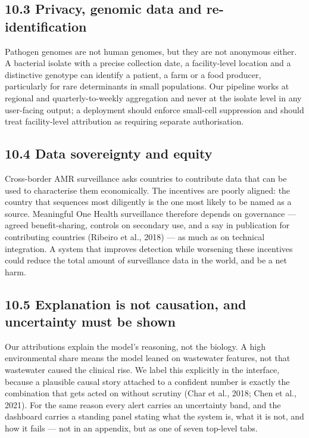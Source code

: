 \documentclass[11pt,a4paper]{article}
\begin{document}
\subsection*{10.3 Privacy, genomic data and re-identification}

Pathogen genomes are not human genomes, but they are not anonymous either. A bacterial isolate with a precise collection date, a facility-level location and a distinctive genotype can identify a patient, a farm or a food producer, particularly for rare determinants in small populations. Our pipeline works at regional and quarterly-to-weekly aggregation and never at the isolate level in any user-facing output; a deployment should enforce small-cell suppression and should treat facility-level attribution as requiring separate authorisation.

\subsection*{10.4 Data sovereignty and equity}

Cross-border AMR surveillance asks countries to contribute data that can be used to characterise them economically. The incentives are poorly aligned: the country that sequences most diligently is the one most likely to be named as a source. Meaningful One Health surveillance therefore depends on governance — agreed benefit-sharing, controls on secondary use, and a say in publication for contributing countries (Ribeiro et al., 2018) — as much as on technical integration. A system that improves detection while worsening these incentives could reduce the total amount of surveillance data in the world, and be a net harm.

\subsection*{10.5 Explanation is not causation, and uncertainty must be shown}

Our attributions explain the model's reasoning, not the biology. A high environmental share means the model leaned on wastewater features, not that wastewater caused the clinical rise. We label this explicitly in the interface, because a plausible causal story attached to a confident number is exactly the combination that gets acted on without scrutiny (Char et al., 2018; Chen et al., 2021). For the same reason every alert carries an uncertainty band, and the dashboard carries a standing panel stating what the system is, what it is not, and how it fails — not in an appendix, but as one of seven top-level tabs.
\end{document}
